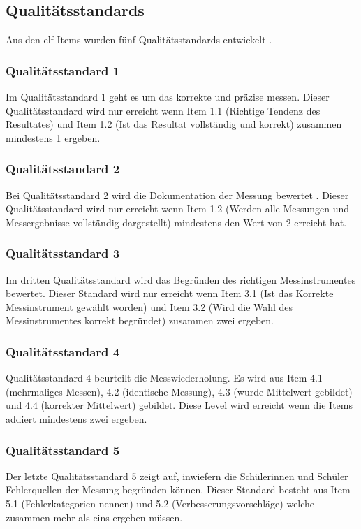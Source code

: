 \subsection{Qualitätsstandards}
Aus den elf Items wurden fünf Qualitätsstandards entwickelt \citep{Hild2014a}.
\subsubsection*{Qualitätsstandard 1}
Im Qualitätsstandard 1 geht es um das korrekte und präzise messen. Dieser Qualitätsstandard wird nur erreicht wenn Item 1.1 (Richtige Tendenz des Resultates) und Item 1.2 (Ist das Resultat vollständig und korrekt) zusammen mindestens 1 ergeben.


\subsubsection*{Qualitätsstandard 2}
Bei Qualitätsstandard 2 wird die Dokumentation der Messung bewertet . Dieser Qualitätsstandard wird nur erreicht wenn Item 1.2 (Werden alle Messungen und Messergebnisse vollständig dargestellt) mindestens den Wert von 2 erreicht hat. 

\subsubsection*{Qualitätsstandard 3}
Im dritten Qualitätsstandard wird das Begründen des richtigen Messinstrumentes bewertet. Dieser Standard wird nur erreicht wenn Item 3.1 (Ist das Korrekte Messinstrument gewählt worden) und Item 3.2 (Wird die Wahl des Messinstrumentes korrekt begründet) zusammen zwei ergeben.

\subsubsection*{Qualitätsstandard 4}
Qualitätsstandard 4 beurteilt die Messwiederholung. Es wird aus Item 4.1 (mehrmaliges Messen), 4.2 (identische Messung), 4.3 (wurde Mittelwert gebildet) und 4.4 (korrekter Mittelwert) gebildet. Diese Level wird erreicht wenn die Items addiert mindestens zwei ergeben.

\subsubsection*{Qualitätsstandard 5}
Der letzte Qualitätsstandard 5 zeigt auf, inwiefern die Schülerinnen und Schüler Fehlerquellen der Messung begründen können. Dieser Standard besteht aus Item 5.1 (Fehlerkategorien nennen) und 5.2 (Verbesserungsvorschläge) welche zusammen mehr als eins ergeben müssen.

